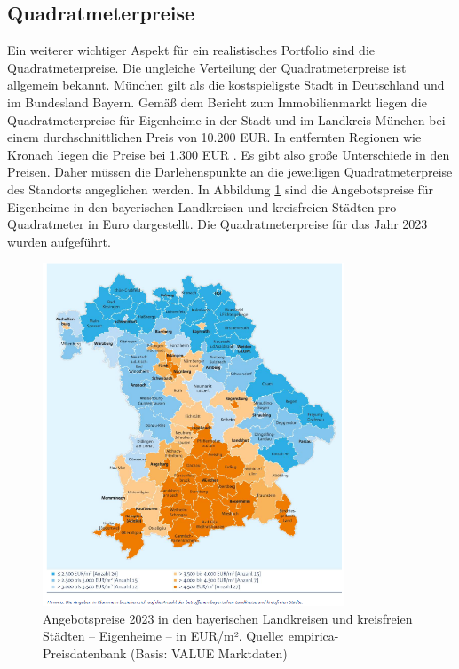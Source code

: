 \subsection{Quadratmeterpreise}
Ein weiterer wichtiger Aspekt für ein realistisches Portfolio sind die Quadratmeterpreise. Die ungleiche Verteilung der Quadratmeterpreise ist allgemein bekannt. München gilt als die kostspieligste Stadt in Deutschland und im Bundesland Bayern. Gemäß dem Bericht zum Immobilienmarkt liegen die Quadratmeterpreise für Eigenheime in der Stadt und im Landkreis München bei einem durchschnittlichen Preis von 10.200 EUR. In entfernten Regionen wie Kronach liegen die Preise bei 1.300 EUR \parencite{bayernlabo2024}. Es gibt also große Unterschiede in den Preisen. Daher müssen die Darlehenspunkte an die jeweiligen Quadratmeterpreise des Standorts angeglichen werden. In Abbildung \ref{fig:preis} sind die Angebotspreise für Eigenheime in den bayerischen Landkreisen und kreisfreien Städten pro Quadratmeter in Euro dargestellt. Die Quadratmeterpreise für das Jahr 2023 wurden aufgeführt.
\begin{figure}[htbp]
    \centering
    \includegraphics[width=0.8\textwidth]{figures/preism2.png}
    \caption{Angebotspreise 2023 in den bayerischen Landkreisen und kreisfreien Städten – Eigenheime – in EUR/m². Quelle: empirica-Preisdatenbank (Basis: VALUE Marktdaten) }
    \label{fig:preis}
\end{figure}
\FloatBarrier